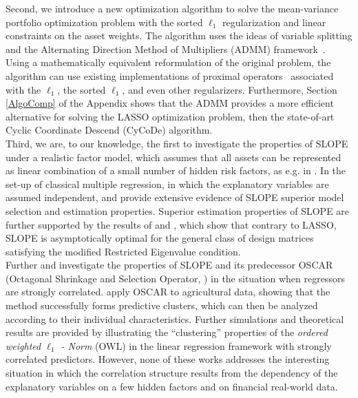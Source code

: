 \documentclass[12pt, a4paper]{article}
\begin{document}
Second, we introduce a new optimization algorithm to solve the mean-variance portfolio optimization problem with the sorted $\ell_1$ regularization and linear constraints on the asset weights. The algorithm uses the ideas of variable splitting and the Alternating Direction Method of Multipliers (ADMM) framework~\citep{Pow69,Hes69,BoyP11}. Using a mathematically equivalent reformulation of the original problem, the algorithm can use existing implementations of proximal operators~\citep{ParB14} associated with the $\ell_1$, the sorted $\ell_1$, and even other regularizers. Furthermore, Section \ref{AlgoComp} of the Appendix shows that the ADMM provides a more efficient alternative for solving the LASSO optimization problem, then the state-of-art Cyclic Coordinate Descend (CyCoDe) algorithm.\\
Third, we are, to our knowledge, the first to investigate the properties of SLOPE under a realistic factor model, which assumes that all assets can be represented as linear combination of a small number of hidden risk factors, as e.g. in \cite{Fan2008}. In the set-up of classical multiple regression, in which the explanatory variables are assumed independent, \cite{Bogdan2013, Bogdan2015} and \cite{Su2016} provide extensive evidence of SLOPE superior model selection and estimation properties. Superior estimation properties of SLOPE are further supported by the results of \cite{Bellec2} and \cite{Bellec1}, which show that contrary to LASSO, SLOPE is asymptotically optimal for the general class of design matrices satisfying the modified Restricted Eigenvalue condition.\\
Further \cite{Bondell2008} and \cite{Figueiredo2014} investigate the properties of SLOPE and its predecessor OSCAR (Octagonal Shrinkage and Selection Operator, \cite{Bondell2008}) in the situation when regressors are strongly correlated. \cite{Bondell2008} apply OSCAR to agricultural data, showing that the method successfully forms predictive clusters, which can then be analyzed according to their individual characteristics. Further simulations and theoretical results are provided by \cite{Figueiredo2014} illustrating the ``clustering'' properties of the \textit{ordered weighted $\ell_{1}$ - Norm} (OWL) in the linear regression framework with strongly correlated predictors. However, none of these works addresses the interesting situation in which the correlation structure results from the dependency of the explanatory variables on a few hidden factors and on financial real-world data.
\end{document}
